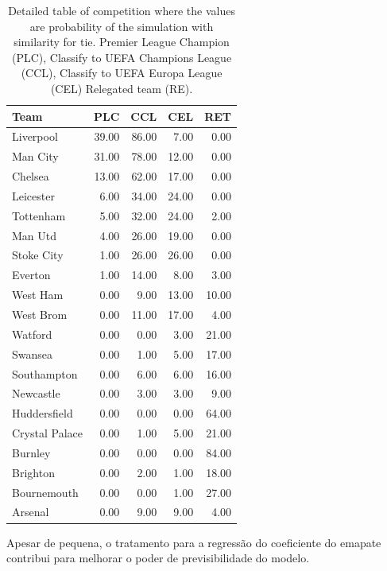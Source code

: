 \documentclass[doc,apacite,oneside,a4paper,12pt]{apa6}
\begin{document}
\begin{table}[ht]
\centering
\begin{tabular}{lrrrr}
  \hline
Team & PLC & CCL& CEL & RET \\ 
  \hline
  Liverpool & 39.00 & 86.00 & 7.00 & 0.00 \\ 
  Man City & 31.00 & 78.00 & 12.00 & 0.00 \\ 
  Chelsea & 13.00 & 62.00 & 17.00 & 0.00 \\ 
  Leicester & 6.00 & 34.00 & 24.00 & 0.00 \\ 
  Tottenham & 5.00 & 32.00 & 24.00 & 2.00 \\ 
  Man Utd & 4.00 & 26.00 & 19.00 & 0.00 \\ 
  Stoke City & 1.00 & 26.00 & 26.00 & 0.00 \\ 
  Everton & 1.00 & 14.00 & 8.00 & 3.00 \\ 
  West Ham & 0.00 & 9.00 & 13.00 & 10.00 \\ 
  West Brom & 0.00 & 11.00 & 17.00 & 4.00 \\ 
  Watford & 0.00 & 0.00 & 3.00 & 21.00 \\ 
  Swansea & 0.00 & 1.00 & 5.00 & 17.00 \\ 
  Southampton & 0.00 & 6.00 & 6.00 & 16.00 \\ 
  Newcastle & 0.00 & 3.00 & 3.00 & 9.00 \\ 
  Huddersfield & 0.00 & 0.00 & 0.00 & 64.00 \\ 
  Crystal Palace & 0.00 & 1.00 & 5.00 & 21.00 \\ 
  Burnley & 0.00 & 0.00 & 0.00 & 84.00 \\ 
  Brighton & 0.00 & 2.00 & 1.00 & 18.00 \\ 
  Bournemouth & 0.00 & 0.00 & 1.00 & 27.00 \\ 
  Arsenal & 0.00 & 9.00 & 9.00 & 4.00 \\ 
   \hline
\end{tabular}
    \caption[\scriptsize{TAVB} with similarity]{\scriptsize{Detailed table of competition where the values are probability of the simulation with similarity for tie. Premier League Champion (PLC), Classify to UEFA Champions League (CCL), Classify to UEFA Europa League (CEL) Relegated team (RE).}}
    \label{tab:forecastsi}
\end{table}

Apesar de pequena, o tratamento para a regressão do coeficiente do emapate contribui para melhorar o poder de previsibilidade do modelo.
\end{document}
